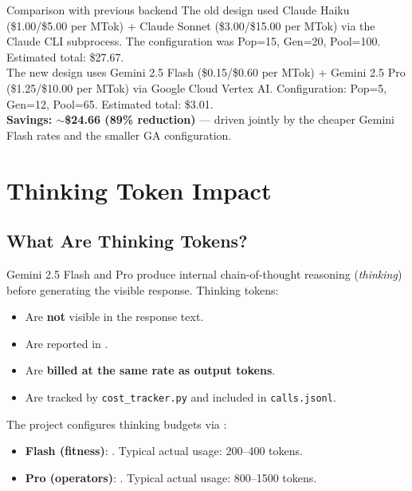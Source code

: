 \documentclass[11pt,a4paper]{report}
\begin{document}
\begin{conceptbox}{Comparison with previous backend}
The old design used Claude Haiku (\$1.00/\$5.00 per MTok) + Claude Sonnet
(\$3.00/\$15.00 per MTok) via the Claude CLI subprocess.  The configuration was
Pop=15, Gen=20, Pool=100.  Estimated total: \$27.67.\\[4pt]
The new design uses Gemini 2.5 Flash (\$0.15/\$0.60 per MTok) + Gemini 2.5 Pro
(\$1.25/\$10.00 per MTok) via Google Cloud Vertex AI.  Configuration: Pop=5, Gen=12,
Pool=65.  Estimated total: \$3.01.\\[4pt]
\textbf{Savings: $\sim$\$24.66 (89\% reduction)} --- driven jointly by the cheaper
Gemini Flash rates and the smaller GA configuration.
\end{conceptbox}


\chapter{Thinking Token Impact}

\section{What Are Thinking Tokens?}

Gemini 2.5 Flash and Pro produce internal chain-of-thought reasoning (\emph{thinking})
before generating the visible response.  Thinking tokens:
\begin{itemize}[nosep]
  \item Are \textbf{not} visible in the response text.
  \item Are reported in .
  \item Are \textbf{billed at the same rate as output tokens}.
  \item Are tracked by \texttt{cost\_tracker.py} and included in \texttt{calls.jsonl}.
\end{itemize}

The project configures thinking budgets via :
\begin{itemize}[nosep]
  \item \textbf{Flash (fitness)}: . Typical actual usage: 200--400 tokens.
  \item \textbf{Pro (operators)}: . Typical actual usage: 800--1500 tokens.
\end{itemize}
\end{document}
